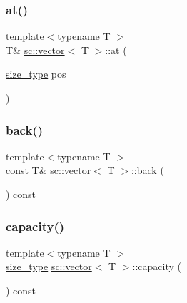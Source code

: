 \mbox{\label{classsc_1_1vector_ab6fc47c9994c531ff8d0a0b46fe422f8}} 
\subsubsection{\texorpdfstring{at()}{at()}}
{\footnotesize\ttfamily template$<$typename T $>$ \\
T\& \hyperlink{classsc_1_1vector}{sc\+::vector}$<$ T $>$\+::at (\begin{DoxyParamCaption}\item[{\hyperlink{classsc_1_1vector_aa4500ebad5be45f8d469fc4b5d62b19d}{size\+\_\+type}}]{pos }\end{DoxyParamCaption})\hspace{0.3cm}{\ttfamily [inline]}}

\mbox{\label{classsc_1_1vector_a90e25706d3a6e4b72db0f5ad35a63abf}} 
\subsubsection{\texorpdfstring{back()}{back()}}
{\footnotesize\ttfamily template$<$typename T $>$ \\
const T\& \hyperlink{classsc_1_1vector}{sc\+::vector}$<$ T $>$\+::back (\begin{DoxyParamCaption}{ }\end{DoxyParamCaption}) const}

\mbox{\label{classsc_1_1vector_a318c4ab34bd9605214e99db94c4258a9}} 
\subsubsection{\texorpdfstring{capacity()}{capacity()}}
{\footnotesize\ttfamily template$<$typename T $>$ \\
\hyperlink{classsc_1_1vector_aa4500ebad5be45f8d469fc4b5d62b19d}{size\+\_\+type} \hyperlink{classsc_1_1vector}{sc\+::vector}$<$ T $>$\+::capacity (\begin{DoxyParamCaption}{ }\end{DoxyParamCaption}) const\hspace{0.3cm}{\ttfamily [inline]}}



